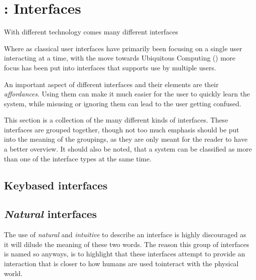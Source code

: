 \section{\todo : Interfaces}
With different technology comes many different interfaces



Where as classical user interfaces have primarily been focusing on a single user interacting at a time, with the move towards Ubiquitous Computing (\todo ) more focus has been put into interfaces that supports use by multiple users. \cite[p. 157-158]{rogers}



An important aspect of different interfaces and their elements are their \emph{affordances}. Using them can make it much easier for the user to quickly learn the system, while misusing or ignoring them can lead to the user getting confused.



This section is a collection of the many different kinds of interfaces. These interfaces are grouped together, though not too much emphasis should be put into the meaning of the groupings, as they are only meant for the reader to have a better overview. It should also be noted, that a system can be classified as more than one of the interface types at the same time.

\subsection{Keybased interfaces}






\subsection{\emph{Natural} interfaces}
The use of \emph{natural} and \emph{intuitive} to describe an interface is highly discouraged as it will dilude the meaning of these two words. The reason this group of interfaces is named so anyways, is to highlight that these interfaces attempt to provide an interaction that is closer to how humans are used tointeract with the physical world.






